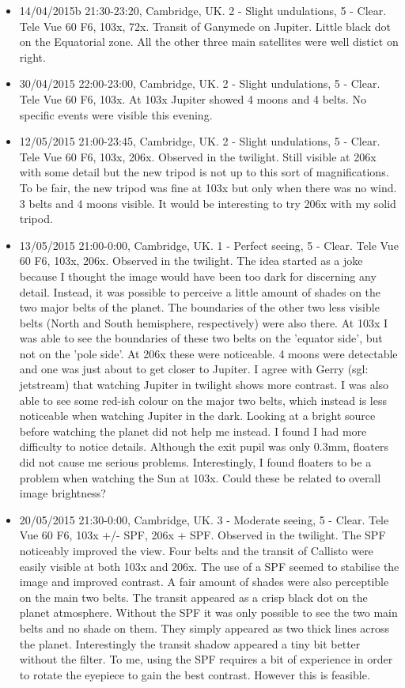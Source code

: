 \begin{itemize}
\item 14/04/2015b 21:30-23:20, Cambridge, UK. 2 - Slight undulations, 5 - Clear. Tele Vue 60 F6, 103x, 72x. Transit of Ganymede on Jupiter. Little black dot on the Equatorial zone. All the other three main satellites were well distict on right.
\item 30/04/2015 22:00-23:00, Cambridge, UK. 2 - Slight undulations, 5 - Clear. Tele Vue 60 F6, 103x. At 103x Jupiter showed 4 moons and 4 belts. No specific events were visible this evening.
\item 12/05/2015 21:00-23:45, Cambridge, UK. 2 - Slight undulations, 5 - Clear. Tele Vue 60 F6, 103x, 206x. Observed in the twilight. Still visible at 206x with some detail but the new tripod is not up to this sort of magnifications. To be fair, the new tripod was fine at 103x but only when there was no wind. 3 belts and 4 moons visible. It would be interesting to try 206x with my solid tripod.
\item 13/05/2015 21:00-0:00, Cambridge, UK. 1 - Perfect seeing, 5 - Clear. Tele Vue 60 F6, 103x, 206x. Observed in the twilight. The idea started as a joke because I thought the image would have been too dark for discerning any detail. Instead, it was possible to perceive a little amount of shades on the two major belts of the planet. The boundaries of the other two less visible belts (North and South hemisphere, respectively) were also there. At 103x I was able to see the boundaries of these two belts on the 'equator side', but not on the 'pole side'. At 206x these were noticeable. 4 moons were detectable and one was just about to get closer to Jupiter. I agree with Gerry (sgl: jetstream) that watching Jupiter in twilight shows more contrast. I was also able to see some red-ish colour on the major two belts, which instead is less noticeable when watching Jupiter in the dark. Looking at a bright source before watching the planet did not help me instead. I found I had more difficulty to notice details. Although the exit pupil was only 0.3mm, floaters did not cause me serious problems. Interestingly, I found floaters to be a problem when watching the Sun at 103x. Could these be related to overall image brightness? 
\item 20/05/2015 21:30-0:00, Cambridge, UK. 3 - Moderate seeing, 5 - Clear. Tele Vue 60 F6, 103x +/- SPF, 206x + SPF. Observed in the twilight. The SPF noticeably improved the view. Four belts and the transit of Callisto were easily visible at both 103x and 206x. The use of a SPF seemed to stabilise the image and improved contrast. A fair amount of shades were also perceptible on the main two belts. The transit appeared as a crisp black dot on the planet atmosphere. Without the SPF it was only possible to see the two main belts and no shade on them. They simply appeared as two thick lines across the planet. Interestingly the transit shadow appeared a tiny bit better without the filter. To me, using the SPF requires a bit of experience in order to rotate the eyepiece to gain the best contrast. However this is feasible.

\end{itemize}
